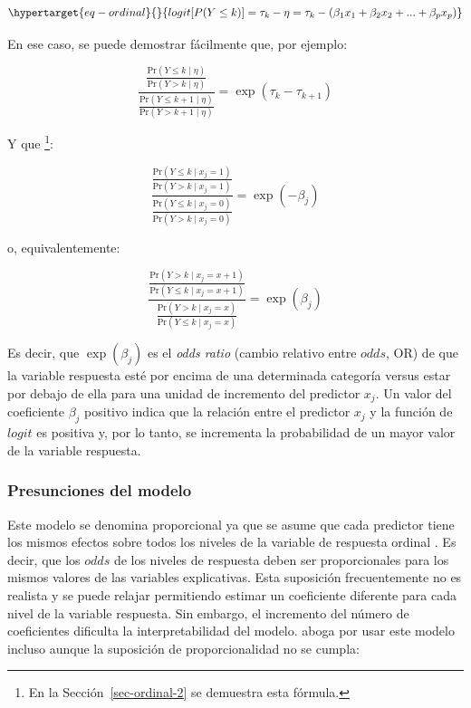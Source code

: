 \documentclass[
  12pt,
  a4paper,
  extrafontsizes,
  onecolumn,
  openright,
  table]{memoir}
\begin{document}
\begin{equation}\protect\hypertarget{eq-ordinal}{}{
logit [P(Y \le k)] = \tau_{k} - \eta = \tau_{k} - (\beta_1 x_1 + \beta_2 x_2 + ... + \beta_p x_p)
}\label{eq-ordinal}\end{equation}

En ese caso, se puede demostrar fácilmente que, por ejemplo:

\[\frac{\frac{\mathrm{Pr}(Y \leq k \mid \eta)}{\mathrm{Pr}(Y > k \mid \eta)}}{\frac{\mathrm{Pr}(Y \leq k+1 \mid \eta)}{\mathrm{Pr}(Y > k+1 \mid \eta)}} = \exp(\tau_{k} - \tau_{k+1})\]

Y que \footnote{En la Sección~\ref{sec-ordinal-2} se demuestra esta
  fórmula.}:

\[\frac{\frac{\mathrm{Pr}(Y \leq k \mid x_j = 1)}{\mathrm{Pr}(Y > k \mid x_j = 1)}}{\frac{\mathrm{Pr}(Y \leq k \mid x_j=0)}{\mathrm{Pr}(Y > k \mid x_j = 0)}} = \exp(-\beta_{j})\]

o, equivalentemente:

\[\frac{\frac{\mathrm{Pr}(Y > k \mid x_j = x + 1)}{\mathrm{Pr}(Y \leq k \mid x_j = x + 1)}}{\frac{\mathrm{Pr}(Y > k \mid x_j = x)}{\mathrm{Pr}(Y \leq k \mid x_j = x)}} = \exp(\beta_{j})\]

Es decir, que \(\exp(\beta_{j})\) es el \emph{odds ratio} (cambio
relativo entre \(odds\), \gls{OR}) de que la variable respuesta esté por
encima de una determinada categoría versus estar por debajo de ella para
una unidad de incremento del predictor \(x_j\). Un valor del coeficiente
\(\beta_j\) positivo indica que la relación entre el predictor \(x_j\) y
la función de \(logit\) es positiva y, por lo tanto, se incrementa la
probabilidad de un mayor valor de la variable respuesta.

\hypertarget{presunciones-del-modelo}{%
\subsubsection{Presunciones del modelo}\label{presunciones-del-modelo}}

Este modelo se denomina proporcional ya que se asume que cada predictor
tiene los mismos efectos sobre todos los niveles de la variable de
respuesta ordinal \autocite[ver][chap.~5]{Liu2202}. Es decir, que los
\(odds\) de los niveles de respuesta deben ser proporcionales para los
mismos valores de las variables explicativas. Esta suposición
frecuentemente no es realista y se puede relajar permitiendo estimar un
coeficiente diferente para cada nivel de la variable respuesta. Sin
embargo, el incremento del número de coeficientes dificulta la
interpretabilidad del modelo. \textcite{harrell2020} aboga por usar este
modelo incluso aunque la suposición de proporcionalidad no se cumpla:
\end{document}
